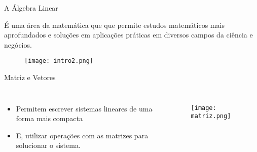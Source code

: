 \begin{frame}[t]{A Álgebra Linear} 

 É uma área da matemática que que permite estudos matemáticos mais aprofundados e soluções em aplicações práticas em diversos campos da ciência e negócios.
 \nocite{baldin2011geometria}\nocite{boldrini1980algebra}\nocite{craig2012robotica}

 \vspace*{0.8cm}

\begin{figure}
    \texttt{[image: intro2.png]}
\end{figure}
            
\end{frame}

\begin{frame}[t]{Matriz e Vetores} 
    \begin{columns}
        \begin{itemize}
            \item Permitem escrever sistemas lineares de uma forma mais compacta
            \item E, utilizar operações com as matrizes para solucionar o sistema.
        \end{itemize}
        \begin{figure}
            \texttt{[image: matriz.png]}
        \end{figure}
    \end{columns}
\end{frame}
